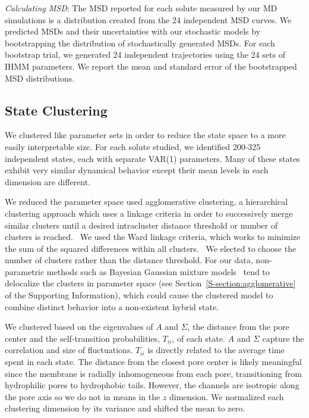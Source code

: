 \documentclass[journal=jpcbfk,manuscript=article]{achemso}
\begin{document}
  \textit{Calculating MSD}: The MSD reported for each solute measured by our MD 
  simulations is a distribution created from the 24 independent MSD curves. We predicted 
  MSDs and their uncertainties with our stochastic models by bootstrapping the 
  distribution of stochastically generated MSDs. For each bootstrap trial, we generated
  24 independent trajectories using the 24 sets of IHMM parameters. We report the mean
  and standard error of the bootstrapped MSD distributions.
  
  \subsection{State Clustering}\label{method:clustering}  

  We clustered like parameter sets in order to reduce the state space to
  a more easily interpretable size. For each solute studied, we identified 200-325
  independent states, each with separate VAR(1) parameters. Many of these states
  exhibit very similar dynamical behavior except their mean levels in each dimension
  are different.
  
  We reduced the parameter space used agglomerative clustering, a hierarchical
  clustering approach which uses a linkage criteria in order to successively merge
  similar clusters until a desired intracluster distance threshold or number of
  clusters is reached.~\cite{pedregosa_scikit-learn_2011} We used the Ward linkage 
  criteria, which works to minimize the sum of the squared differences within all
  clusters.~\cite{ward_hierarchical_1963} We elected to choose the number of clusters
  rather than the distance threshold. For our data, non-parametric methods such as 
  Bayesian Gaussian mixture models~\cite{pedregosa_scikit-learn_2011,gelman_bayesian_2013}
  tend to delocalize the clusters in parameter space (see Section~\ref{S-section:agglomerative}
  of the Supporting Information), which could cause the clustered model to combine 
  distinct behavior into a non-existent hybrid state.

  We clustered based on the eigenvalues of $A$ and $\Sigma$, the distance from the 
  pore center and the self-transition probabilities, $T_{ii}$, of each state. $A$ 
  and $\Sigma$ capture the correlation and size of fluctuations. $T_{ii}$ is directly
  related to the average time spent in each state. The distance from the closest pore 
  center is likely meaningful since the membrane is radially inhomogeneous from each 
  pore, transitioning from hydrophilic pores to hydrophobic tails. However, the 
  channels are isotropic along the pore axis so we do not in means in the $z$ dimension.
  We normalized each clustering dimension by its variance and shifted the mean to zero.
  
\end{document}
